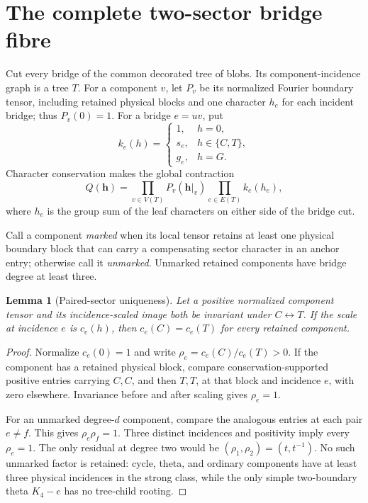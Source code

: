 \documentclass[11pt]{article}
\newtheorem{lemma}[theorem]{Lemma}
\theoremstyle{remark}
\newcommand{\1}{\mathbf 1}
\begin{document}
\section{The complete two-sector bridge fibre}\label{sec:bridges}

Cut every bridge of the common decorated tree of blobs.  Its
component-incidence graph is a tree \(T\).  For a component \(v\), let
\(P_v\) be its normalized Fourier boundary tensor, including retained physical
blocks and one character \(h_e\) for each incident bridge; thus \(P_v(0)=1\).
For a bridge \(e=uv\), put
\[
 k_e(h)=
 \begin{cases}
 1,&h=0,\\
 s_e,&h\in\{C,T\},\\
 g_e,&h=G.
 \end{cases}
\]
Character conservation makes the global contraction
\begin{equation}\label{eq:bridge-contraction}
 Q(\mathbf h)=
 \prod_{v\in V(T)}P_v(\mathbf h|_v)
 \prod_{e\in E(T)}k_e(h_e),
\end{equation}
where \(h_e\) is the group sum of the leaf characters on either side of the
bridge cut.

Call a component \emph{marked} when its local tensor retains at least one
physical boundary block that can carry a compensating sector character in an
anchor entry; otherwise call it \emph{unmarked}.  Unmarked retained components
have bridge degree at least three.

\begin{lemma}[Paired-sector uniqueness]\label{lem:paired-scale}
Let a positive normalized component tensor and its incidence-scaled image
both be invariant under \(C\leftrightarrow T\).  If the scale at incidence
\(e\) is \(c_e(h)\), then \(c_e(C)=c_e(T)\) for every retained component.
\end{lemma}

\begin{proof}
Normalize \(c_e(0)=1\) and write
\(\rho_e=c_e(C)/c_e(T)>0\).  If the component has a retained physical block,
compare conservation-supported positive entries carrying \(C,C\), and then
\(T,T\), at that block and incidence \(e\), with zero elsewhere.  Invariance
before and after scaling gives \(\rho_e=1\).

For an unmarked degree-\(d\) component, compare the analogous entries at
each pair \(e\ne f\).  This gives \(\rho_e\rho_f=1\).  Three distinct
incidences and positivity imply every \(\rho_e=1\).  The only residual at
degree two would be \((\rho_1,\rho_2)=(t,t^{-1})\).  No such unmarked factor
is retained: cycle, theta, and ordinary components have at least three
physical incidences in the strong class, while the only simple two-boundary
theta \(K_4-e\) has no tree-child rooting.
\end{proof}
\end{document}

